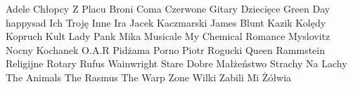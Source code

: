 \documentclass{article}
\begin{document}
{ Adele   \newline
 Chłopcy Z Placu Broni   \newline
 Coma   \newline
 Czerwone Gitary   \newline
 Dziecięce   \newline
 Green Day   \newline
 happysad   \newline
 Ich Troję   \newline
 Inne   \newline
 Ira   \newline
 Jacek Kaczmarski   \newline
 James Blunt   \newline
 Kazik   \newline
 Kolędy   \newline
 Kopruch   \newline
 Kult   \newline
 Lady Pank   \newline
 Mika   \newline
 Musicale   \newline
 My Chemical Romance   \newline
 Myslovitz   \newline
 Nocny Kochanek   \newline
 O.A.R   \newline
 Pidżama Porno   \newline
 Piotr Rogucki   \newline
 Queen   \newline
 Rammstein   \newline
 Religijne   \newline
 Rotary   \newline
 Rufus Wainwright   \newline
 Stare Dobre Małżeństwo   \newline
 Strachy Na Lachy   \newline
 The Animals   \newline
 The Rasmus   \newline
 The Warp Zone   \newline
 Wilki   \newline
 Zabili Mi Żółwia   \newline

 }


 
\end{document}
